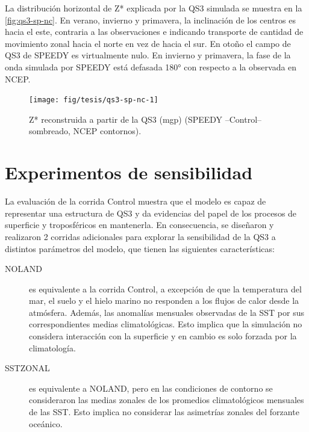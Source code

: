 \documentclass[spanish,a4paper,12pt,oneside]{book}
\begin{document}
La distribución horizontal de Z* explicada por la QS3 simulada se
muestra en la \autoref{fig:qs3-sp-nc}. En verano, invierno y primavera,
la inclinación de los centros es hacia el este, contraria a las
observaciones e indicando transporte de cantidad de movimiento zonal
hacia el norte en vez de hacia el sur. En otoño el campo de QS3 de
SPEEDY es virtualmente nulo. En invierno y primavera, la fase de la onda
simulada por SPEEDY está defasada 180° con respecto a la observada en
NCEP.

\begin{figure}
\texttt{[image: fig/tesis/qs3-sp-nc-1]} \caption{Z* reconstruida a partir de la QS3 (mgp) (SPEEDY --Control-- sombreado, NCEP contornos).}\label{fig:qs3-sp-nc}
\end{figure}

\hypertarget{experimentos-de-sensibilidad}{%
\section{Experimentos de
sensibilidad}\label{experimentos-de-sensibilidad}}

La evaluación de la corrida Control muestra que el modelo es capaz de
representar una estructura de QS3 y da evidencias del papel de los
procesos de superficie y troposféricos en mantenerla. En consecuencia,
se diseñaron y realizaron 2 corridas adicionales para explorar la
sensibilidad de la QS3 a distintos parámetros del modelo, que tienen las
siguientes características:

\begin{description}

\item[NOLAND]
es equivalente a la corrida Control, a excepción de que la temperatura del mar, el suelo y el hielo marino no responden a los flujos de calor desde la atmósfera. Además, las anomalías mensuales observadas de la SST por sus correspondientes medias climatológicas. Esto implica que la simulación no considera interacción con la superficie y en cambio es solo forzada por la climatología.

\item[SSTZONAL]

es equivalente a NOLAND, pero en las condiciones de contorno se consideraron las medias zonales de los promedios climatológicos mensuales de las SST. Esto implica no considerar las asimetrías zonales del forzante oceánico.

\end{description}
\end{document}
